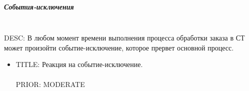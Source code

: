 \subparagraph{События-исключения} \label{exception_events} \mbox{}\\

	DESC: В любом момент времени выполнения процесса обработки заказа в СТ может произойти событие-исключение, которое прервет основной процесс.

	\begin{itemize}
		\item {
			TITLE: Реакция на событие-исключение.\\
			\\
			PRIOR: MODERATE\\
		}
	\end{itemize}

     
    
    